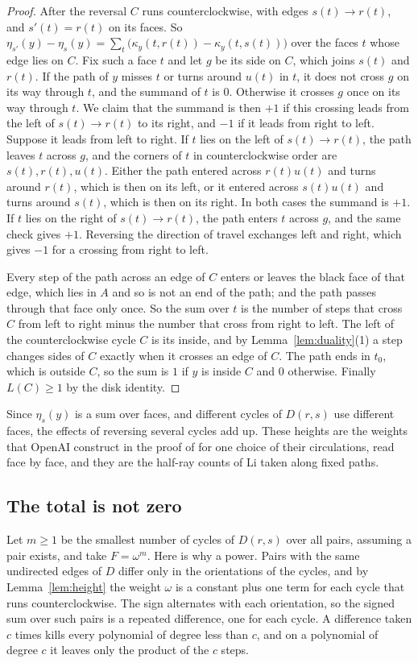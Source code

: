 \documentclass[10pt]{amsart}
\numberwithin{equation}{section}
\theoremstyle{definition}
\theoremstyle{remark}
\begin{document}
\begin{proof}
After the reversal $C$ runs counterclockwise, with edges $s(t)\to r(t)$, and $s'(t)=r(t)$ on its faces.
So $\eta_{s'}(y)-\eta_s(y)=\sum_t\bigl(\kappa_y(t,r(t))-\kappa_y(t,s(t))\bigr)$ over the faces $t$ whose edge lies on $C$.
Fix such a face $t$ and let $g$ be its side on $C$, which joins $s(t)$ and $r(t)$.
If the path of $y$ misses $t$ or turns around $u(t)$ in $t$, it does not cross $g$ on its way through $t$, and the summand of $t$ is $0$.
Otherwise it crosses $g$ once on its way through $t$.
We claim that the summand is then $+1$ if this crossing leads from the left of $s(t)\to r(t)$ to its right, and $-1$ if it leads from right to left.
Suppose it leads from left to right.
If $t$ lies on the left of $s(t)\to r(t)$, the path leaves $t$ across $g$, and the corners of $t$ in counterclockwise order are $s(t),r(t),u(t)$.
Either the path entered across $r(t)u(t)$ and turns around $r(t)$, which is then on its left, or it entered across $s(t)u(t)$ and turns around $s(t)$, which is then on its right.
In both cases the summand is $+1$.
If $t$ lies on the right of $s(t)\to r(t)$, the path enters $t$ across $g$, and the same check gives $+1$.
Reversing the direction of travel exchanges left and right, which gives $-1$ for a crossing from right to left.

Every step of the path across an edge of $C$ enters or leaves the black face of that edge, which lies in $A$ and so is not an end of the path; and the path passes through that face only once.
So the sum over $t$ is the number of steps that cross $C$ from left to right minus the number that cross from right to left.
The left of the counterclockwise cycle $C$ is its inside, and by Lemma~\ref{lem:duality}(1) a step changes sides of $C$ exactly when it crosses an edge of $C$.
The path ends in $t_0$, which is outside $C$, so the sum is $1$ if $y$ is inside $C$ and $0$ otherwise.
Finally $L(C)\ge1$ by the disk identity.
\end{proof}

Since $\eta_s(y)$ is a sum over faces, and different cycles of $D(r,s)$ use different faces, the effects of reversing several cycles add up.
These heights are the weights that OpenAI construct in the proof of \cite[Lemma~5.3]{openai2026} for one choice of their circulations, read face by face, and they are the half-ray counts of Li \cite[Section~4]{li2026} taken along fixed paths.

\subsection*{The total is not zero}
Let $m\ge1$ be the smallest number of cycles of $D(r,s)$ over all pairs, assuming a pair exists, and take $F=\omega^m$.
Here is why a power.
Pairs with the same undirected edges of $D$ differ only in the orientations of the cycles, and by Lemma~\ref{lem:height} the weight $\omega$ is a constant plus one term for each cycle that runs counterclockwise.
The sign alternates with each orientation, so the signed sum over such pairs is a repeated difference, one for each cycle.
A difference taken $c$ times kills every polynomial of degree less than $c$, and on a polynomial of degree $c$ it leaves only the product of the $c$ steps.
\end{document}
